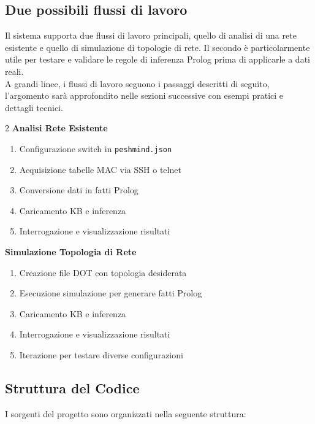 \documentclass[12pt,a4paper]{article}
\begin{document}
\subsection{Due possibili flussi di lavoro}

Il sistema supporta due flussi di lavoro principali, quello di analisi di una rete esistente e 
quello di simulazione di topologie di rete. Il secondo è particolarmente utile per testare e validare le regole
di inferenza Prolog prima di applicarle a dati reali. \\
A grandi linee, i flussi di lavoro seguono i passaggi descritti di seguito, l'argomento sarà approfondito nelle sezioni
successive con esempi pratici e dettagli tecnici.

\begin{multicols}{2}
        \textbf{Analisi Rete Esistente}
        \begin{enumerate}
            \item Configurazione switch in \texttt{peshmind.json}
            \item Acquisizione tabelle MAC via SSH o telnet
            \item Conversione dati in fatti Prolog
            \item Caricamento KB e inferenza
            \item Interrogazione e visualizzazione risultati
        \end{enumerate}
\columnbreak
        \textbf{Simulazione Topologia di Rete}
        \begin{enumerate}
            \item Creazione file DOT con topologia desiderata
            \item Esecuzione simulazione per generare fatti Prolog
            \item Caricamento KB e inferenza
            \item Interrogazione e visualizzazione risultati
            \item Iterazione per testare diverse configurazioni
        \end{enumerate}
\end{multicols}

\subsection{Struttura del Codice}

I sorgenti del progetto sono organizzati nella seguente struttura:
\end{document}
